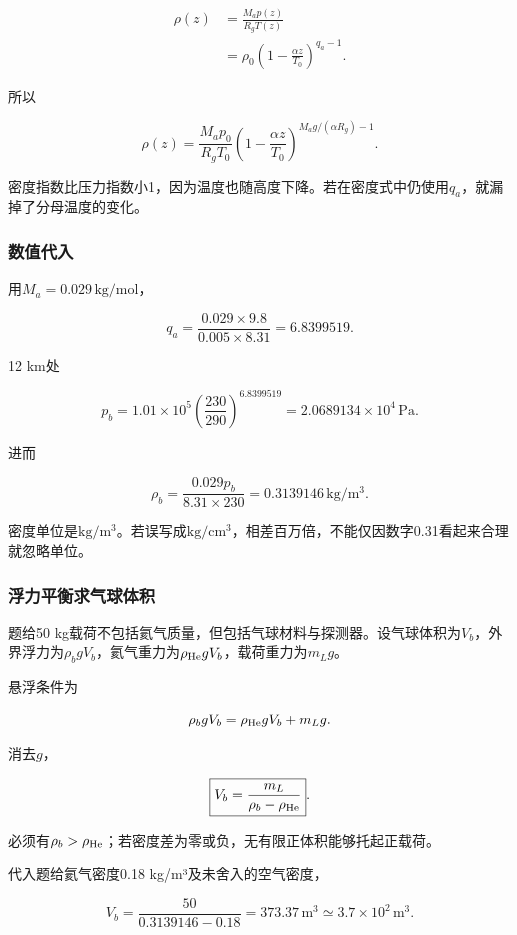 \documentclass[12pt,a4paper,fontset=fandol]{ctexart}
\begin{document}
\[
\begin{aligned}
\rho(z)
&=\frac{M_ap(z)}{R_gT(z)}\\
&=\rho_0
\left(1-\frac{\alpha z}{T_0}\right)^{q_a-1}.
\end{aligned}
\]

所以

\[
\boxed{
\rho(z)=\frac{M_ap_0}{R_gT_0}
\left(1-\frac{\alpha z}{T_0}\right)^{
M_ag/(\alpha R_g)-1}}.
\]

密度指数比压力指数小1，因为温度也随高度下降。若在密度式中仍使用\(q_a\)，就漏掉了分母温度的变化。

\subsubsection{数值代入}\label{ux6570ux503cux4ee3ux5165}

用\(M_a=0.029\,\mathrm{kg/mol}\)，

\[
q_a=\frac{0.029\times9.8}{0.005\times8.31}
=6.8399519.
\]

12 km处

\[
p_b=1.01\times10^5
\left(\frac{230}{290}\right)^{6.8399519}
=2.0689134\times10^4\,\mathrm{Pa}.
\]

进而

\[
\boxed{
\rho_b=\frac{0.029p_b}{8.31\times230}
=0.3139146\,\mathrm{kg/m^3}}.
\]

密度单位是\(\mathrm{kg/m^3}\)。若误写成\(\mathrm{kg/cm^3}\)，相差百万倍，不能仅因数字0.31看起来合理就忽略单位。

\subsubsection{浮力平衡求气球体积}\label{ux6d6eux529bux5e73ux8861ux6c42ux6c14ux7403ux4f53ux79ef}

题给50
kg载荷不包括氦气质量，但包括气球材料与探测器。设气球体积为\(V_b\)，外界浮力为\(\rho_bgV_b\)，氦气重力为\(\rho_{\rm He}gV_b\)，载荷重力为\(m_Lg\)。

悬浮条件为

\[
\rho_bgV_b=\rho_{\rm He}gV_b+m_Lg.
\]

消去\(g\)，

\[
\boxed{V_b=\frac{m_L}{\rho_b-\rho_{\rm He}}}.
\]

必须有\(\rho_b>\rho_{\rm He}\)；若密度差为零或负，无有限正体积能够托起正载荷。

代入题给氦气密度0.18 kg/m³及未舍入的空气密度，

\[
\boxed{
V_b=\frac{50}{0.3139146-0.18}
=373.37\,\mathrm{m^3}
\simeq3.7\times10^2\,\mathrm{m^3}}.
\]
\end{document}
